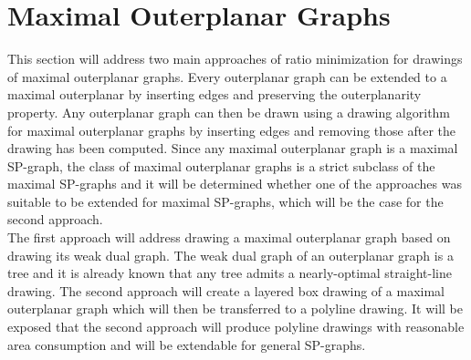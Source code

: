 \section{Maximal Outerplanar Graphs}\label{s:maximal_outerplanar}

This section will address two main approaches of ratio minimization for drawings of maximal outerplanar graphs. Every outerplanar graph can be extended to a maximal outerplanar by inserting edges and preserving the outerplanarity property. Any outerplanar graph can then be drawn using a drawing algorithm for maximal outerplanar graphs by inserting edges and removing those after the drawing has been computed. Since any maximal outerplanar graph is a maximal SP-graph, the class of maximal outerplanar graphs is a strict subclass of the maximal SP-graphs and it will be determined whether one of the approaches was suitable to be extended for maximal SP-graphs, which will be the case for the second approach.\\
The first approach will address drawing a maximal outerplanar graph based on drawing its weak dual graph. The weak dual graph of an outerplanar graph is a tree and it is already known that any tree admits a nearly-optimal straight-line drawing. The second approach will create a layered box drawing of a maximal outerplanar graph which will then be transferred to a polyline drawing. It will be exposed that the second approach will produce polyline drawings with reasonable area consumption and will be extendable for general SP-graphs.

